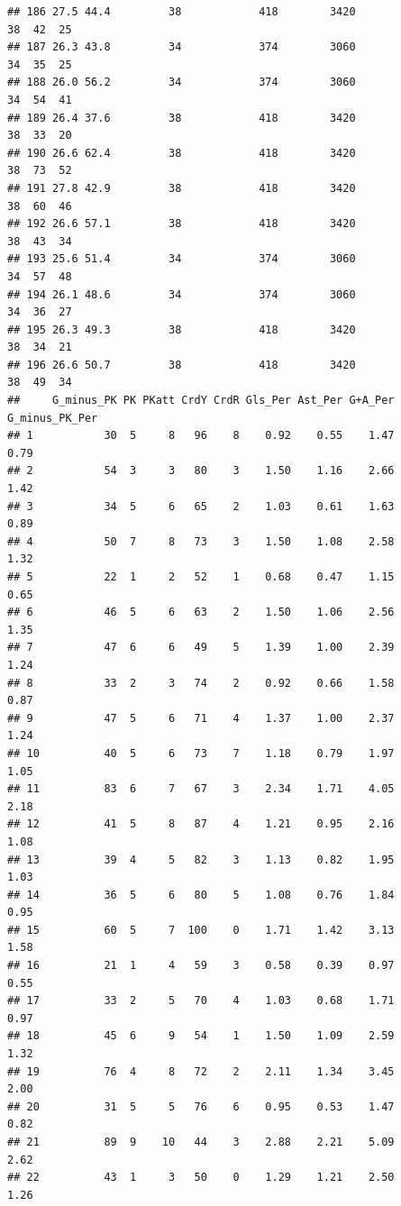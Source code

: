 \documentclass[
]{book}
\theoremstyle{definition}
\theoremstyle{definition}
\theoremstyle{definition}
\theoremstyle{definition}
\theoremstyle{remark}
\begin{document}
\begin{verbatim}
## 186 27.5 44.4         38            418        3420                  38  42  25
## 187 26.3 43.8         34            374        3060                  34  35  25
## 188 26.0 56.2         34            374        3060                  34  54  41
## 189 26.4 37.6         38            418        3420                  38  33  20
## 190 26.6 62.4         38            418        3420                  38  73  52
## 191 27.8 42.9         38            418        3420                  38  60  46
## 192 26.6 57.1         38            418        3420                  38  43  34
## 193 25.6 51.4         34            374        3060                  34  57  48
## 194 26.1 48.6         34            374        3060                  34  36  27
## 195 26.3 49.3         38            418        3420                  38  34  21
## 196 26.6 50.7         38            418        3420                  38  49  34
##     G_minus_PK PK PKatt CrdY CrdR Gls_Per Ast_Per G+A_Per G_minus_PK_Per
## 1           30  5     8   96    8    0.92    0.55    1.47           0.79
## 2           54  3     3   80    3    1.50    1.16    2.66           1.42
## 3           34  5     6   65    2    1.03    0.61    1.63           0.89
## 4           50  7     8   73    3    1.50    1.08    2.58           1.32
## 5           22  1     2   52    1    0.68    0.47    1.15           0.65
## 6           46  5     6   63    2    1.50    1.06    2.56           1.35
## 7           47  6     6   49    5    1.39    1.00    2.39           1.24
## 8           33  2     3   74    2    0.92    0.66    1.58           0.87
## 9           47  5     6   71    4    1.37    1.00    2.37           1.24
## 10          40  5     6   73    7    1.18    0.79    1.97           1.05
## 11          83  6     7   67    3    2.34    1.71    4.05           2.18
## 12          41  5     8   87    4    1.21    0.95    2.16           1.08
## 13          39  4     5   82    3    1.13    0.82    1.95           1.03
## 14          36  5     6   80    5    1.08    0.76    1.84           0.95
## 15          60  5     7  100    0    1.71    1.42    3.13           1.58
## 16          21  1     4   59    3    0.58    0.39    0.97           0.55
## 17          33  2     5   70    4    1.03    0.68    1.71           0.97
## 18          45  6     9   54    1    1.50    1.09    2.59           1.32
## 19          76  4     8   72    2    2.11    1.34    3.45           2.00
## 20          31  5     5   76    6    0.95    0.53    1.47           0.82
## 21          89  9    10   44    3    2.88    2.21    5.09           2.62
## 22          43  1     3   50    0    1.29    1.21    2.50           1.26

\end{verbatim}
\end{document}

